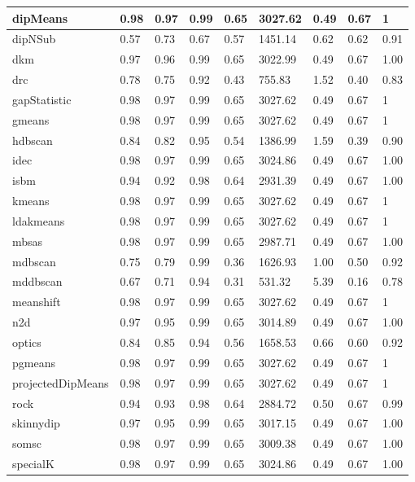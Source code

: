\begin{table}[H]
\begin{tabular}{|l|l|l|l|l|l|l|l|l|}
\hline
dipMeans & 0.98 & 0.97 & 0.99 & 0.65 & 3027.62 & 0.49 & 0.67 & 1 \\
\hline
dipNSub & 0.57 & 0.73 & 0.67 & 0.57 & 1451.14 & 0.62 & 0.62 & 0.91 \\
\hline
dkm & 0.97 & 0.96 & 0.99 & 0.65 & 3022.99 & 0.49 & 0.67 & 1.00 \\
\hline
drc & 0.78 & 0.75 & 0.92 & 0.43 & 755.83 & 1.52 & 0.40 & 0.83 \\
\hline
gapStatistic & 0.98 & 0.97 & 0.99 & 0.65 & 3027.62 & 0.49 & 0.67 & 1 \\
\hline
gmeans & 0.98 & 0.97 & 0.99 & 0.65 & 3027.62 & 0.49 & 0.67 & 1 \\
\hline
hdbscan & 0.84 & 0.82 & 0.95 & 0.54 & 1386.99 & 1.59 & 0.39 & 0.90 \\
\hline
idec & 0.98 & 0.97 & 0.99 & 0.65 & 3024.86 & 0.49 & 0.67 & 1.00 \\
\hline
isbm & 0.94 & 0.92 & 0.98 & 0.64 & 2931.39 & 0.49 & 0.67 & 1.00 \\
\hline
kmeans & 0.98 & 0.97 & 0.99 & 0.65 & 3027.62 & 0.49 & 0.67 & 1 \\
\hline
ldakmeans & 0.98 & 0.97 & 0.99 & 0.65 & 3027.62 & 0.49 & 0.67 & 1 \\
\hline
mbsas & 0.98 & 0.97 & 0.99 & 0.65 & 2987.71 & 0.49 & 0.67 & 1.00 \\
\hline
mdbscan & 0.75 & 0.79 & 0.99 & 0.36 & 1626.93 & 1.00 & 0.50 & 0.92 \\
\hline
mddbscan & 0.67 & 0.71 & 0.94 & 0.31 & 531.32 & 5.39 & 0.16 & 0.78 \\
\hline
meanshift & 0.98 & 0.97 & 0.99 & 0.65 & 3027.62 & 0.49 & 0.67 & 1 \\
\hline
n2d & 0.97 & 0.95 & 0.99 & 0.65 & 3014.89 & 0.49 & 0.67 & 1.00 \\
\hline
optics & 0.84 & 0.85 & 0.94 & 0.56 & 1658.53 & 0.66 & 0.60 & 0.92 \\
\hline
pgmeans & 0.98 & 0.97 & 0.99 & 0.65 & 3027.62 & 0.49 & 0.67 & 1 \\
\hline
projectedDipMeans & 0.98 & 0.97 & 0.99 & 0.65 & 3027.62 & 0.49 & 0.67 & 1 \\
\hline
rock & 0.94 & 0.93 & 0.98 & 0.64 & 2884.72 & 0.50 & 0.67 & 0.99 \\
\hline
skinnydip & 0.97 & 0.95 & 0.99 & 0.65 & 3017.15 & 0.49 & 0.67 & 1.00 \\
\hline
somsc & 0.98 & 0.97 & 0.99 & 0.65 & 3009.38 & 0.49 & 0.67 & 1.00 \\
\hline
specialK & 0.98 & 0.97 & 0.99 & 0.65 & 3024.86 & 0.49 & 0.67 & 1.00 \\

\end{tabular}
\end{table}
